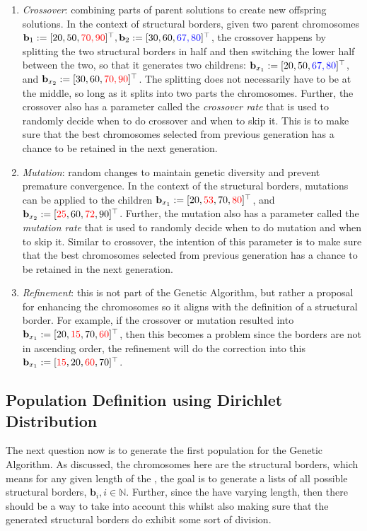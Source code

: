 \begin{enumerate}
    \item \textit{Crossover}: combining parts of parent solutions to create new offspring solutions. In the context of structural borders, given two parent chromosomes $\mathbf{b}_1:=[20,50,\textcolor{red}{70,90}]^{\top}, \mathbf{b}_2:=[30,60,\textcolor{blue}{67,80}]^{\top}$, the crossover happens by splitting the two structural borders in half and then switching the lower half between the two, so that it generates two childrens: $\mathbf{b}_{x_1}:=[20,50,\textcolor{blue}{67,80}]^{\top}$, and $\mathbf{b}_{x_2}:=[30,60,\textcolor{red}{70,90}]^{\top}$. The splitting does not necessarily have to be at the middle, so long as it splits into two parts the chromosomes. Further, the crossover also has a parameter called the \textit{crossover rate} that is used to randomly decide when to do crossover and when to skip it. This is to make sure that the best chromosomes selected from previous generation has a chance to be retained in the next generation.
    \item \textit{Mutation}: random changes to maintain genetic diversity and prevent premature convergence. In the context of the structural borders, mutations can be applied to the children $\mathbf{b}_{x_1}:=[20,\textcolor{red}{53},70,\textcolor{red}{80}]^{\top}$, and $\mathbf{b}_{x_2}:=[\textcolor{red}{25},60,\textcolor{red}{72},90]^{\top}$. Further, the mutation also has a parameter called the \textit{mutation rate} that is used to randomly decide when to do mutation and when to skip it. Similar to crossover, the intention of this parameter is to make sure that the best chromosomes selected from previous generation has a chance to be retained in the next generation.
    \item \textit{Refinement}: this is not part of the Genetic Algorithm, but rather a proposal for enhancing the chromosomes so it aligns with the definition of a structural border. For example, if the crossover or mutation resulted into $\mathbf{b}_{x_1}:=[20,\textcolor{red}{15},70,\textcolor{red}{60}]^{\top}$, then this becomes a problem since the borders are not in ascending order, the refinement will do the correction into this $\mathbf{b}_{x_1}:=[\textcolor{red}{15}, 20,\textcolor{red}{60},\newline 70]^{\top}$.
\end{enumerate}
\subsection{Population Definition using Dirichlet Distribution}
The next question now is to generate the first population for the Genetic Algorithm. As discussed, the chromosomes here are the structural borders, which means for any given length of the  , the goal is to generate a lists of all possible structural borders, $\mathbf{b}_i, i\in\mathbb{N}$. Further, since the   have varying length, then there should be a way to take into account this whilst also making sure that the generated structural borders do exhibit some sort of division.

